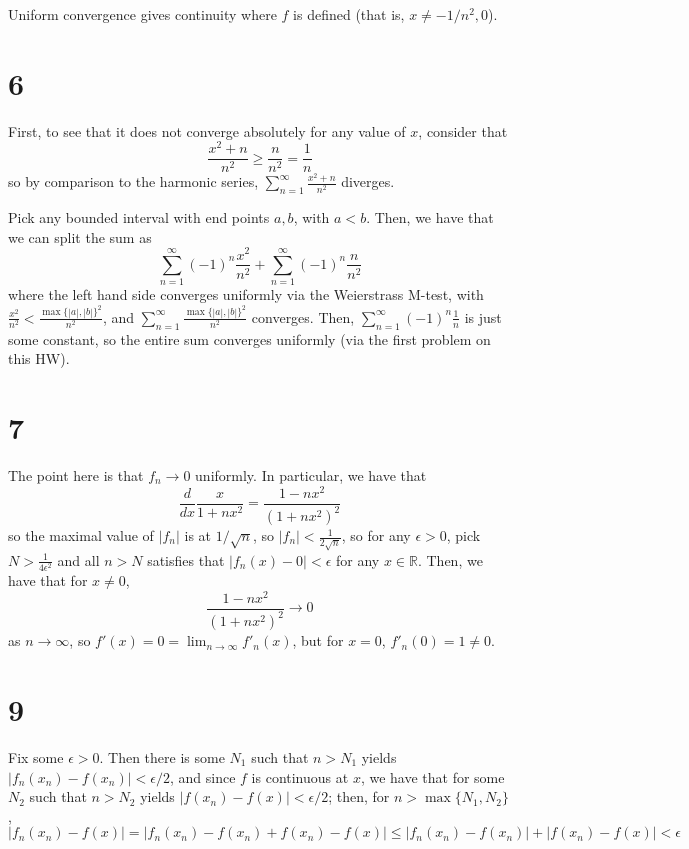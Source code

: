 \documentclass[12pt,letterpaper]{article}
\theoremstyle{definition}
\newcommand{\R}{\mathbb{R}}
\begin{document}
Uniform convergence gives continuity where $f$ is defined (that is, $x \neq -1/n^{2}, 0$).

\section*{6}

First, to see that it does not converge absolutely for any value of $x$, consider that
\[
  \frac{x^{2}+n}{n^{2}} \geq \frac{n}{n^{2}} = \frac{1}{n}
\]
so by comparison to the harmonic series, $\sum_{n=1}^{\infty}\frac{x^{2}+n}{n^{2}}$ diverges.

Pick any bounded interval with end points $a, b$, with $a < b$. Then, we have that we can split the sum as
\[
  \sum_{n=1}^{\infty}(-1)^{n}\frac{x^{2}}{n^{2}} + \sum_{n=1}^{\infty}(-1)^{n}\frac{n}{n^{2}}
\]
where the left hand side converges uniformly via the Weierstrass M-test, with $\frac{x^{2}}{n^{2}} < \frac{\max\{|a|,|b|\}^{2}}{n^{2}}$, and $\sum_{n=1}^{\infty}\frac{\max\{|a|,|b|\}^{2}}{n^{2}}$ converges. Then, $\sum_{n=1}^{\infty}(-1)^{n}\frac{1}{n}$ is just some constant, so the entire sum converges uniformly (via the first problem on this HW).

\section*{7}

The point here is that $f_{n} \rightarrow 0$ uniformly. In particular, we have that
\[
  \frac{d}{dx}\frac{x}{1 + nx^{2}} = \frac{1-nx^{2}}{(1+nx^{2})^{2}}
\]
so the maximal value of $|f_{n}|$ is at $1/\sqrt{n}$, so $|f_{n}| < \frac{1}{2\sqrt{n}}$, so for any $\epsilon > 0$, pick $N > \frac{1}{4\epsilon^{2}}$ and all $n > N$ satisfies that $|f_{n}(x) - 0| < \epsilon$ for any $x \in \R$. Then, we have that for $x \neq 0$,
\[
  \frac{1-nx^{2}}{(1+nx^{2})^{2}} \rightarrow 0
\]
as $n \rightarrow \infty$, so $f'(x) = 0 = \lim_{n \rightarrow \infty}f'_{n}(x)$, but for $x = 0$, $f'_{n}(0) = 1 \neq 0$.

\section*{9}

Fix some $\epsilon > 0$. Then there is some $N_{1}$ such that $n > N_{1}$ yields $|f_{n}(x_{n}) - f(x_{n})| < \epsilon/2$, and since $f$ is continuous at $x$, we have that for some $N_{2}$ such that $n > N_{2}$ yields $|f(x_{n}) - f(x)| < \epsilon/2$; then, for $n > \max\{N_{1}, N_{2}\}$,
\[
  |f_{n}(x_{n}) - f(x)| = |f_{n}(x_{n}) - f(x_{n}) + f(x_{n}) - f(x)| \leq |f_{n}(x_{n}) - f(x_{n})| + |f(x_{n}) - f(x)| < \epsilon
\]
\end{document}
